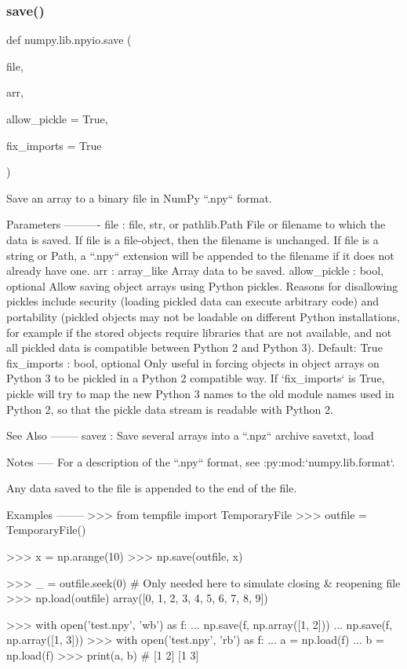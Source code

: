 \subsubsection{\texorpdfstring{save()}{save()}}
{\footnotesize\ttfamily def numpy.\+lib.\+npyio.\+save (\begin{DoxyParamCaption}\item[{}]{file,  }\item[{}]{arr,  }\item[{}]{allow\+\_\+pickle = {\ttfamily True},  }\item[{}]{fix\+\_\+imports = {\ttfamily True} }\end{DoxyParamCaption})}

\begin{DoxyVerb}Save an array to a binary file in NumPy ``.npy`` format.

Parameters
----------
file : file, str, or pathlib.Path
    File or filename to which the data is saved.  If file is a file-object,
    then the filename is unchanged.  If file is a string or Path, a ``.npy``
    extension will be appended to the filename if it does not already
    have one.
arr : array_like
    Array data to be saved.
allow_pickle : bool, optional
    Allow saving object arrays using Python pickles. Reasons for disallowing
    pickles include security (loading pickled data can execute arbitrary
    code) and portability (pickled objects may not be loadable on different
    Python installations, for example if the stored objects require libraries
    that are not available, and not all pickled data is compatible between
    Python 2 and Python 3).
    Default: True
fix_imports : bool, optional
    Only useful in forcing objects in object arrays on Python 3 to be
    pickled in a Python 2 compatible way. If `fix_imports` is True, pickle
    will try to map the new Python 3 names to the old module names used in
    Python 2, so that the pickle data stream is readable with Python 2.

See Also
--------
savez : Save several arrays into a ``.npz`` archive
savetxt, load

Notes
-----
For a description of the ``.npy`` format, see :py:mod:`numpy.lib.format`.

Any data saved to the file is appended to the end of the file.

Examples
--------
>>> from tempfile import TemporaryFile
>>> outfile = TemporaryFile()

>>> x = np.arange(10)
>>> np.save(outfile, x)

>>> _ = outfile.seek(0) # Only needed here to simulate closing & reopening file
>>> np.load(outfile)
array([0, 1, 2, 3, 4, 5, 6, 7, 8, 9])


>>> with open('test.npy', 'wb') as f:
...     np.save(f, np.array([1, 2]))
...     np.save(f, np.array([1, 3]))
>>> with open('test.npy', 'rb') as f:
...     a = np.load(f)
...     b = np.load(f)
>>> print(a, b)
# [1 2] [1 3]
\end{DoxyVerb}
 \mbox{\label{namespacenumpy_1_1lib_1_1npyio_a88314a43793724e74e5e7f13794756e6}} 
